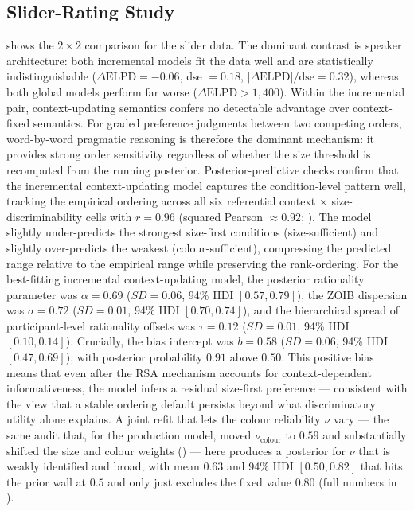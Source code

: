 \documentclass[man,floatsintext]{apa7}
\begin{document}
\subsection{Slider-Rating Study}

 shows the $2 \times 2$ comparison for the slider data.
The dominant contrast is speaker architecture: both incremental models fit the data well and are statistically indistinguishable ($\Delta\text{ELPD} = -0.06$, dse $= 0.18$, $|\Delta\text{ELPD}|/\text{dse} = 0.32$), whereas both global models perform far worse ($\Delta\text{ELPD} > 1{,}400$).
Within the incremental pair, context-updating semantics confers no detectable advantage over context-fixed semantics.
For graded preference judgments between two competing orders, word-by-word pragmatic reasoning is therefore the dominant mechanism: it provides strong order sensitivity regardless of whether the size threshold is recomputed from the running posterior.
Posterior-predictive checks confirm that the incremental context-updating model captures the condition-level pattern well, tracking the empirical ordering across all six referential context $\times$ size-discriminability cells with $r = 0.96$ (squared Pearson $\approx 0.92$; ).
The model slightly under-predicts the strongest size-first conditions (size-sufficient) and slightly over-predicts the weakest (colour-sufficient), compressing the predicted range relative to the empirical range while preserving the rank-ordering.
For the best-fitting incremental context-updating model, the posterior rationality parameter was $\alpha = 0.69$ ($\mathit{SD} = 0.06$, 94\% HDI $[0.57, 0.79]$), the ZOIB dispersion was $\sigma = 0.72$ ($\mathit{SD} = 0.01$, 94\% HDI $[0.70, 0.74]$), and the hierarchical spread of participant-level rationality offsets was $\tau = 0.12$ ($\mathit{SD} = 0.01$, 94\% HDI $[0.10, 0.14]$).
Crucially, the bias intercept was $b = 0.58$ ($\mathit{SD} = 0.06$, 94\% HDI $[0.47, 0.69]$), with posterior probability $0.91$ above $0.50$.
This positive bias means that even after the RSA mechanism accounts for context-dependent informativeness, the model infers a residual size-first preference --- consistent with the view that a stable ordering default persists beyond what discriminatory utility alone explains.
A joint refit that lets the colour reliability $\nu$ vary --- the same audit that, for the production model, moved $\nu_\text{colour}$ to $0.59$ and substantially shifted the size and colour weights () --- here produces a posterior for $\nu$ that is weakly identified and broad, with mean $0.63$ and 94\% HDI $[0.50, 0.82]$ that hits the prior wall at $0.5$ and only just excludes the fixed value $0.80$ (full numbers in ).
\end{document}
